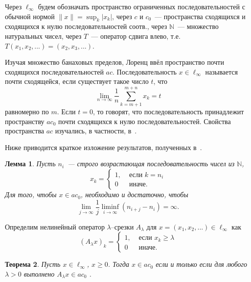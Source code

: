 \documentclass[a4paper,11pt]{article} %
\theoremstyle{plain}
\newtheorem{lemma}{Лемма}[section]
\newtheorem{theorem}[lemma]{Теорема}
\begin{document}
Через $\ell_\infty$ будем обозначать пространство ограниченных последовательностей с обычной нормой
$
	\|x\| = \sup_{k} |x_k|
$,
через $c$ и $c_0$~--- пространства сходящихся и сходящихся к нулю последовательностей соотв.,
через $\mathbb{N}$~--- множество натуральных чисел,
через $T$~--- оператор сдвига влево, т.е.
$T(x_1,x_2,...) = (x_2,x_3,...)$.


Изучая множество банаховых пределов, Лоренц \cite{lorentz1948contribution}
ввёл пространство почти сходящихся последовательностей $ac$.
Последовательность $x\in\ell_\infty$ называется почти сходящейся,
если существует такое число $t$, что
\begin{equation}
\label{eq:intro_ac}
	\lim_{n\to\infty} \frac{1}{n} \sum_{k=m+1}^{m+n} x_k = t
\end{equation}
равномерно по $m$.
Если $t=0$, то говорят, что последовательность
принадлежит пространству $ac_0$ почти сходящихся к нулю последовательностей.
Свойства пространства $ac$ изучались, в частности, в~\cite{alekhno2006propertiesII,usachev2009_phd_vsu}.

Ниже приводится краткое изложение результатов, полученных в~\cite{our-mz2019ac0}.

\begin{lemma}
Пусть $n_i$~--- строго возрастающая последовательность чисел из $\mathbb{N}$,
\begin{equation*}
	x_k = \left\{\begin{array}{ll}
		1, & \mbox{~если~} k = n_i
		\\
		0  & \mbox{~иначе.~}
	\end{array}\right.
\end{equation*}
Для того, чтобы $x\in ac_0$,
необходимо и достаточно, чтобы
\begin{equation}\label{lim_M(j)/j}
	\lim_{j \to \infty} \frac{1}{j} \liminf_{i\to\infty} (n_{i+j} - n_i) = \infty
	.
\end{equation}
\end{lemma}


Определим нелинейный оператор $\lambda$--срезки $A_\lambda$
для $x = (x_1, x_2, ...)\in\ell_\infty$ как
\begin{equation*}
	(A_\lambda x)_k = \begin{cases}
		1, & \mbox{~если~} x_k \geq \lambda
		\\
		0  & \mbox{~иначе.~}
	\end{cases}
\end{equation*}

\begin{theorem}
\label{thm:lambda_prelim}
Пусть $x\in\ell_\infty$, $x\geq 0$.
Тогда
$
	x\in ac_0
$
если и только если
для любого $\lambda > 0$
выполнено
$
	A_\lambda x \in ac_0
$
.
\end{theorem}
\end{document}

